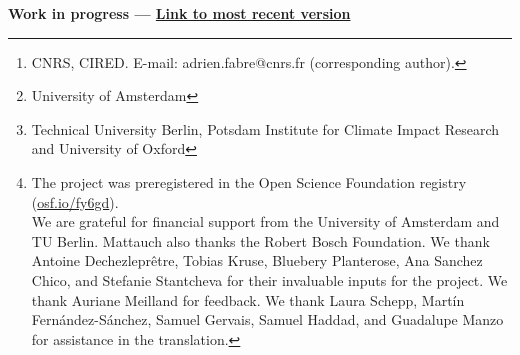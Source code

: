 \author{Adrien Fabre$^{1,2}$, Thomas Douenne$^3$ and Linus Mattauch$^{4,5,6}$} %
\author{Adrien Fabre\footnote{CNRS, CIRED. E-mail: adrien.fabre@cnrs.fr (corresponding author).}, Thomas Douenne\footnote{University of Amsterdam}\; and Linus Mattauch\footnote{Technical University Berlin, Potsdam Institute for Climate Impact Research and University of Oxford}~~\thanks{The project %
was preregistered in the Open Science Foundation registry (\href{https://osf.io/fy6gd}{osf.io/fy6gd}). \\ We are grateful for financial support from the University of Amsterdam and TU Berlin. Mattauch also thanks the Robert Bosch Foundation. %
We thank Antoine Dechezleprêtre, Tobias Kruse, Bluebery Planterose, Ana Sanchez Chico, and Stefanie Stantcheva for their invaluable inputs for the project. We thank Auriane Meilland for feedback. We thank Laura Schepp, Martín Fernández-Sánchez, Samuel Gervais, Samuel Haddad, and Guadalupe Manzo for assistance in the translation. }} %

\date{\today} %



\maketitle

\begin{center}
{\textbf{Work in progress --- \href{https://github.com/bixiou/global_tax_attitudes/raw/main/paper/US1.pdf}{Link to most recent version}}}
\end{center}



